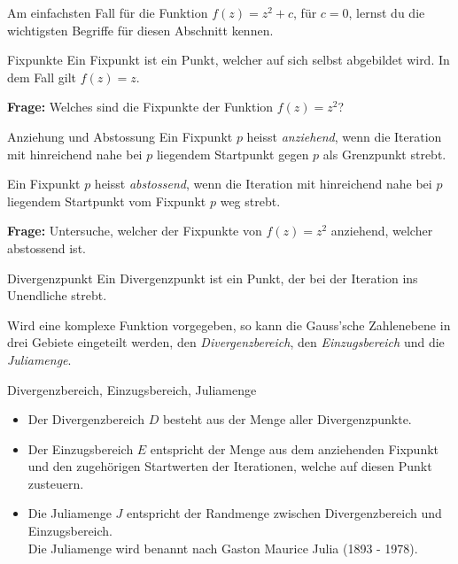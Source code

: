 Am einfachsten Fall für die Funktion \( f(z) = z^2 + c \), für \( c = 0 \), lernst du die wichtigsten Begriffe für diesen Abschnitt kennen.

\begin{definition}
    {Fixpunkte}{}
    Ein Fixpunkt ist ein Punkt, welcher auf sich selbst abgebildet wird. In dem Fall gilt \( f(z) = z \).
\end{definition}

\textbf{Frage:} Welches sind die Fixpunkte der Funktion $f(z) = z^2$?

\begin{definition}
    {Anziehung und Abstossung}{}
    Ein Fixpunkt \( p \) heisst \emph{anziehend}, wenn die Iteration mit hinreichend nahe bei \( p \) liegendem Startpunkt gegen \( p \) als Grenzpunkt strebt.

Ein Fixpunkt \( p \) heisst \emph{abstossend}, wenn die Iteration mit hinreichend nahe bei \( p \) liegendem Startpunkt vom Fixpunkt \( p \) weg strebt.
\end{definition}




   
\textbf{Frage:} Untersuche, welcher der Fixpunkte von \( f(z) = z^2 \) anziehend, welcher abstossend ist.



\begin{definition}
    {Divergenzpunkt}{}
    Ein Divergenzpunkt ist ein Punkt, der bei der Iteration ins Unendliche strebt.
\end{definition}


Wird eine komplexe Funktion vorgegeben, so kann die Gauss’sche Zahlenebene in drei Gebiete eingeteilt werden, den \emph{Divergenzbereich}, den \emph{Einzugsbereich} und die \emph{Juliamenge}.


\begin{definition}
    {Divergenzbereich, Einzugsbereich, Juliamenge}{}
    \begin{itemize}
        \item Der Divergenzbereich \( D \) besteht aus der Menge aller Divergenzpunkte.
        \item Der Einzugsbereich \( E \) entspricht der Menge aus dem anziehenden Fixpunkt und den zugehörigen Startwerten der Iterationen, welche auf diesen Punkt zusteuern.
        \item Die Juliamenge $J$ entspricht der Randmenge zwischen Divergenzbereich und Einzugsbereich. \\
Die Juliamenge wird benannt nach Gaston Maurice Julia (1893 - 1978).
    \end{itemize}
\end{definition}

